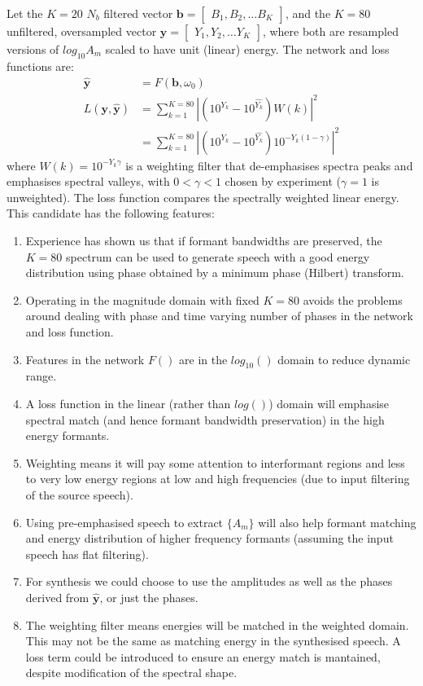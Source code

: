 \documentclass{article}
\begin{document}
Let the $K=20$ $N_b$ filtered vector $\mathbf{b} = \begin{bmatrix} B_1, B_2, \ldots B_K \end{bmatrix}$, and the $K=80$ unfiltered, oversampled vector $\mathbf{y} = \begin{bmatrix} Y_1, Y_2, \ldots Y_K \end{bmatrix}$, where both are resampled versions of $log_{10}A_m$ scaled to have unit (linear) energy. The network and loss functions are:
\begin{equation}
\begin{split}
\hat{\mathbf{y}} &= F(\mathbf{b},\omega_0) \\
L(\mathbf{y},\hat{\mathbf{y}}) &= \sum_{k=1}^{K=80}|(10^{Y_k}-10^{\hat{Y_k}})W(k)|^2 \\
      &= \sum_{k=1}^{K=80}|(10^{Y_k}-10^{\hat{Y_k}})10^{-Y_k (1-\gamma)}|^2
\end{split}
\end{equation}
where $W(k)=10^{-Y_k \gamma}$ is a weighting filter that de-emphasises spectra peaks and emphasises spectral valleys, with $0<\gamma<1$ chosen by experiment ($\gamma =1$ is unweighted).  The loss function compares the spectrally weighted linear energy. This candidate has the following features:
\begin{enumerate}
\item Experience has shown us that if formant bandwidths are preserved, the $K=80$ spectrum can be used to generate speech with a good energy distribution using phase obtained by a minimum phase (Hilbert) transform.
\item Operating in the magnitude domain with fixed $K=80$ avoids the problems around dealing with phase and time varying number of phases in the network and loss function.
\item Features in the network $F()$ are in the $log_{10}()$ domain to reduce dynamic range. 
\item A loss function in the linear (rather than $log()$) domain will emphasise spectral match (and hence formant bandwidth preservation) in the high energy formants.
\item Weighting means it will pay some attention to interformant regions and less to very low energy regions at low and high frequencies (due to input filtering of the source speech).
\item Using pre-emphasised speech to extract $\{A_m\}$ will also help formant matching and energy distribution of higher frequency formants (assuming the input speech has flat filtering).
\item For synthesis we could choose to use the amplitudes as well as the phases derived from $\hat{\mathbf{y}}$, or just the phases.
\item The weighting filter means energies will be matched in the weighted domain.  This may not be the same as matching energy in the synthesised speech. A loss term could be introduced to ensure an energy match is mantained, despite modification of the spectral shape.
\end{enumerate}
\end{document}
